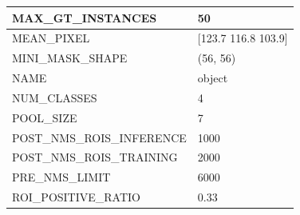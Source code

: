 \begin{longtable}[h]{|l|l|}
	MAX\_GT\_INSTANCES              & 50                                                                                                                                                                                     \\ \hline
	MEAN\_PIXEL                     & {[}123.7 116.8 103.9{]}                                                                                                                                                                \\ \hline
	MINI\_MASK\_SHAPE               & (56, 56)                                                                                                                                                                               \\ \hline
	NAME                            & object                                                                                                                                                                                 \\ \hline
	NUM\_CLASSES                    & 4                                                                                                                                                                                      \\ \hline
	POOL\_SIZE                      & 7                                                                                                                                                                                      \\ \hline
	POST\_NMS\_ROIS\_INFERENCE      & 1000                                                                                                                                                                                   \\ \hline
	POST\_NMS\_ROIS\_TRAINING       & 2000                                                                                                                                                                                   \\ \hline
	PRE\_NMS\_LIMIT                 & 6000                                                                                                                                                                                   \\ \hline
	ROI\_POSITIVE\_RATIO            & 0.33                                                                                                                                                                                   \\ \hline

\end{longtable}
